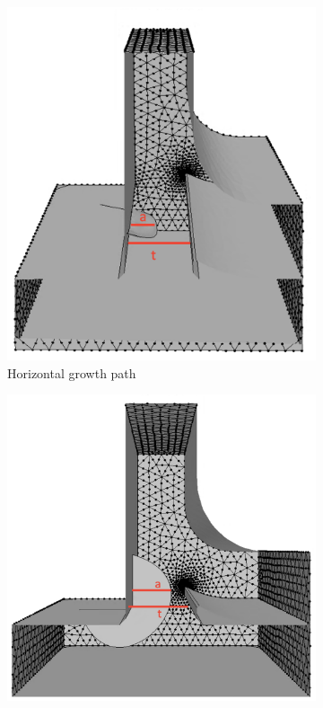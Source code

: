 \begin{figure}[h!]
  \begin{subfigure}[b]{0.5\textwidth}
    \includegraphics[width=\textwidth]{horizontal_growth.png}
    \caption{Horizontal growth path}
    \label{fig:horizontal_growth}
  \end{subfigure}
  \hfill
  \begin{subfigure}[b]{0.5\textwidth}
    \includegraphics[width=\textwidth]{horizontal_growth2.png}

\end{subfigure}
\end{figure}

